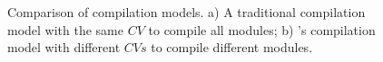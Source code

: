 \begin{figure}
\centering
{}
\caption{Comparison of compilation models. a) A traditional compilation
  model with the same $CV$ to compile all modules; b) \toolname's
  compilation model with different $CVs$ to compile
  different modules.}
\label{fig:cms}
\end{figure}


